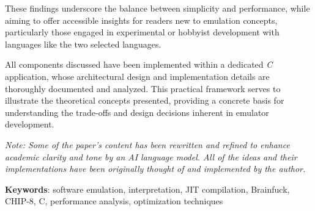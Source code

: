 \documentclass[12pt]{scrreport}
\begin{document}
\par These findings underscore the balance between simplicity and performance, while aiming to offer accessible insights for readers new to emulation concepts, particularly those engaged in experimental or hobbyist development with languages like the two selected languages.

\par All components discussed have been implemented within a dedicated \textit{C} application, whose architectural design and implementation details are thoroughly documented and analyzed. This practical framework serves to illustrate the theoretical concepts presented, providing a concrete basis for understanding the trade-offs and design decisions inherent in emulator development.

\vspace{0.5em}

\textit{Note: Some of the paper's content has been rewritten and refined to enhance academic clarity and tone by an AI language model. All of the ideas and their implementations have been originally thought of and implemented by the author.}

\vspace{0.5em}

\textbf{Keywords}: software emulation, interpretation, JIT compilation, Brainfuck, CHIP-8, C, performance analysis, optimization techniques

\tableofcontents
\newpage
{}








\end{document}

